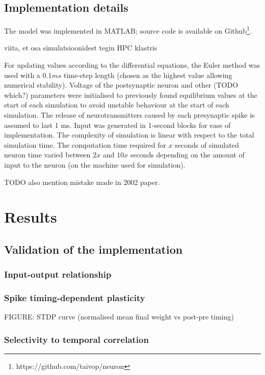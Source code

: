 \documentclass[a4paper,12pt]{report}
\theoremstyle{definition}
\begin{document}
\section{Implementation details}

The model was implemented in MATLAB; source code is available on Github\footnote{https://github.com/taivop/neuron}.

viita, et osa simulatsioonidest tegin HPC klastris

For updating values according to the differential equations, the Euler method was used with a $0.1ms$ time-step length (chosen as the highest value allowing numerical stability). Voltage of the postsynaptic neuron and other (TODO which?) parameters were initialised to previously found equilibrium values at the start of each simulation to avoid unstable behaviour at the start of each simulation. The release of neurotransmitters caused by each presynaptic spike is assumed to last 1 ms. Input was generated in 1-second blocks for ease of implementation. The complexity of simulation is linear with respect to the total simulation time. The computation time required for $x$ seconds of simulated neuron time varied between $2x$ and $10x$ seconds depending on the amount of input to the neuron (on the machine used for simulation).

TODO also mention mistake made in 2002 paper.




\chapter{Results}
\section{Validation of the implementation}

\subsection{Input-output relationship}

\subsection{Spike timing-dependent plasticity}
FIGURE: STDP curve (normalised mean final weight vs post-pre timing)

\subsection{Selectivity to temporal correlation} %
\end{document}
